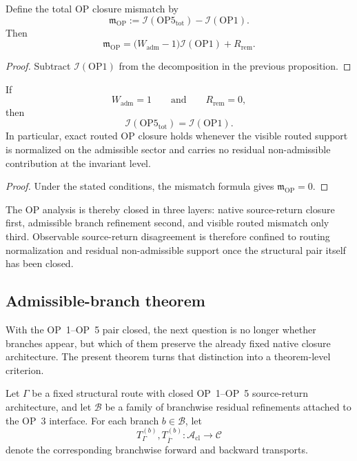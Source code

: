 \begin{corollary}
Define the total OP closure mismatch by
\[
\mathfrak{m}_{\mathrm{OP}}
:=
\mathcal{I}(\mathrm{OP5}_{\mathrm{tot}})-\mathcal{I}(\mathrm{OP1}).
\]
Then
\[
\mathfrak{m}_{\mathrm{OP}}
=
\bigl(W_{\mathrm{adm}}-1\bigr)\mathcal{I}(\mathrm{OP1}) + R_{\mathrm{rem}}.
\]
\end{corollary}

\begin{proof}
Subtract $\mathcal{I}(\mathrm{OP1})$ from the decomposition in the previous proposition.
\end{proof}

\begin{corollary}
If
\[
W_{\mathrm{adm}}=1
\qquad\text{and}\qquad
R_{\mathrm{rem}}=0,
\]
then
\[
\mathcal{I}(\mathrm{OP5}_{\mathrm{tot}})=\mathcal{I}(\mathrm{OP1}).
\]
In particular, exact routed OP closure holds whenever the visible routed support is normalized on the admissible sector and carries no residual non-admissible contribution at the invariant level.
\end{corollary}

\begin{proof}
Under the stated conditions, the mismatch formula gives $\mathfrak{m}_{\mathrm{OP}}=0$.
\end{proof}

\begin{remark}
The OP analysis is thereby closed in three layers: native source-return closure first, admissible branch refinement second, and visible routed mismatch only third. Observable source-return disagreement is therefore confined to routing normalization and residual non-admissible support once the structural pair itself has been closed.
\end{remark}



\subsection{Admissible-branch theorem}
\label{sec:admissible-branch-theorem}

With the OP~1--OP~5 pair closed, the next question is no longer whether branches appear, but which of them preserve the already fixed native closure architecture. The present theorem turns that distinction into a theorem-level criterion.

Let $\Gamma$ be a fixed structural route with closed OP~1--OP~5 source-return architecture, and let $\mathcal{B}$ be a family of branchwise residual refinements attached to the OP~3 interface. For each branch $b\in\mathcal{B}$, let
\[
T_{\Gamma}^{(b)},T_{\overline{\Gamma}}^{(b)}:\mathcal{A}_{\mathrm{cl}}\to\mathcal{C}
\]
denote the corresponding branchwise forward and backward transports.

